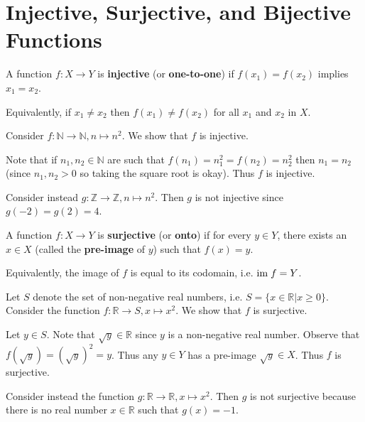 \section{Injective, Surjective, and Bijective Functions}
\begin{definition}
    A function $f: X \to Y$ is \textbf{injective} (or \textbf{one-to-one}) if $f(x_1) = f(x_2)$ implies $x_1 = x_2$.
\end{definition}
\begin{remark}
    Equivalently, if $x_1 \neq x_2$ then $f(x_1) \neq f(x_2)$ for all $x_1$ and $x_2$ in $X$.
\end{remark}
\begin{example}
    Consider $f: \mathbb{N} \to \mathbb{N}, n \mapsto n^2$. We show that $f$ is injective.
    
    Note that if $n_1, n_2 \in \mathbb{N}$ are such that $f(n_1) = n_1^2 = f(n_2) = n_2^2$ then $n_1 = n_2$ (since $n_1, n_2 > 0$ so taking the square root is okay). Thus $f$ is injective.
\end{example}
\begin{example}
    Consider instead $g: \mathbb{Z} \to \mathbb{Z}, n \mapsto n^2$. Then $g$ is not injective since $g(-2) = g(2) = 4$.
\end{example}

\begin{definition}
    A function $f: X \to Y$ is \textbf{surjective} (or \textbf{onto}) if for every $y \in Y$, there exists an $x \in X$ (called the \textbf{pre-image} of $y$) such that $f(x) = y$.
\end{definition}
\begin{remark}
    Equivalently, the image of $f$ is equal to its codomain, i.e. $\mathrm{im}\; f = Y$.
\end{remark}
\begin{example}
    Let $S$ denote the set of non-negative real numbers, i.e. $S = \{x\in\mathbb{R} | x \geq 0\}$. Consider the function $f: \mathbb{R} \to S, x \mapsto x^2$. We show that $f$ is surjective.

    Let $y \in S$. Note that $\sqrt{y} \in \mathbb{R}$ since $y$ is a non-negative real number. Observe that $f(\sqrt{y}) = (\sqrt y)^2 = y$. Thus any $y \in Y$ has a pre-image $\sqrt y \in X$. Thus $f$ is surjective.
\end{example}
\begin{example}
    Consider instead the function $g: \mathbb{R} \to \mathbb{R}, x \mapsto x^2$. Then $g$ is not surjective because there is no real number $x \in \mathbb{R}$ such that $g(x) = -1$.
\end{example}

